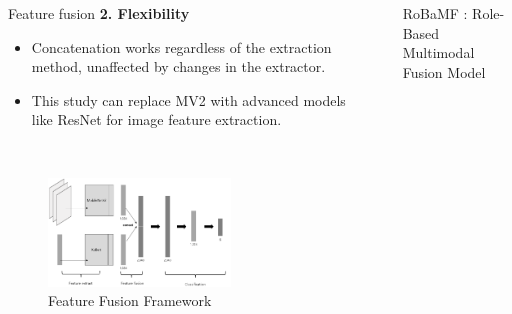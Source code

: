 \documentclass[final]{beamer}
\newlength{\sepwidth}
\newlength{\colwidth}
\newcommand{\separatorcolumn}{\begin{column}{\sepwidth}\end{column}}
\newcommand{\bz}{{\bf z}}
\newcommand{\ben}{\begin{enumerate}}
\newcommand{\een}{\end{enumerate}}
\begin{document}
\begin{frame}[t]
\begin{columns}[t]
\begin{column}{\colwidth}
\begin{block}{Feature fusion}
    \textbf{2. Flexibility}\\
    \begin{itemize}
    \item Concatenation works regardless of the extraction method, unaffected by changes in the extractor.
    \item This study can replace MV2 with advanced models like ResNet for image feature extraction.
    \end{itemize}
\\


    \begin{figure}[ht]
    \centering
    \includegraphics[width=0.67\textwidth]{Figure/feature-fusion-baseline.png}
    \caption{Feature Fusion Framework}
    \label{fig:fusion framework}
    \end{figure}


    \end{block}

    

\end{column}

\separatorcolumn

\begin{column}{\colwidth}

    \begin{alertblock}{RoBaMF : Role-Based Multimodal Fusion Model}
    

\end{alertblock}
\end{column}
\end{columns}
\end{frame}
\end{document}
